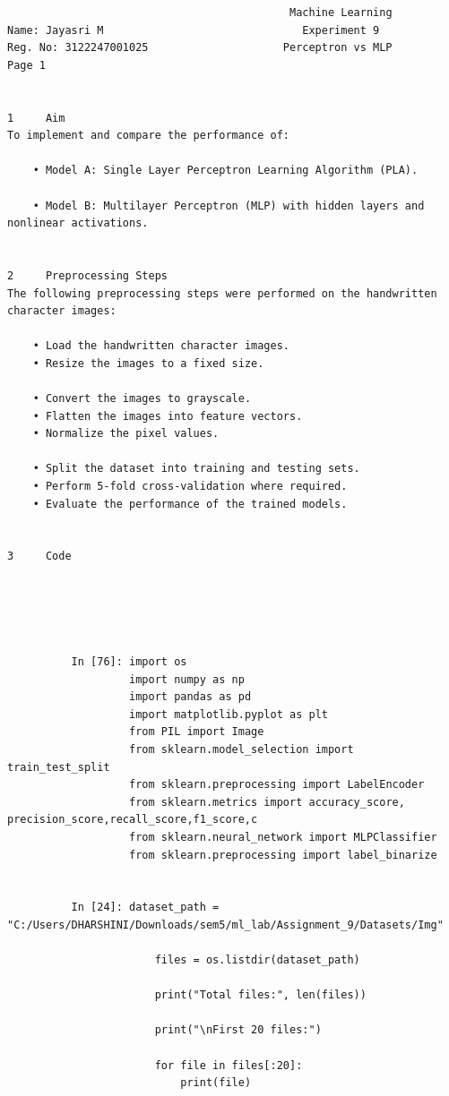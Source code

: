 \documentclass[12pt,a4paper]{article}
\begin{document}
\begin{lstlisting}
                                            Machine Learning
Name: Jayasri M                               Experiment 9
Reg. No: 3122247001025                     Perceptron vs MLP                               Page 1


1     Aim
To implement and compare the performance of:

    • Model A: Single Layer Perceptron Learning Algorithm (PLA).

    • Model B: Multilayer Perceptron (MLP) with hidden layers and nonlinear activations.


2     Preprocessing Steps
The following preprocessing steps were performed on the handwritten character images:

    • Load the handwritten character images.
    • Resize the images to a fixed size.

    • Convert the images to grayscale.
    • Flatten the images into feature vectors.
    • Normalize the pixel values.

    • Split the dataset into training and testing sets.
    • Perform 5-fold cross-validation where required.
    • Evaluate the performance of the trained models.


3     Code





          In [76]: import os
                   import numpy as np
                   import pandas as pd
                   import matplotlib.pyplot as plt
                   from PIL import Image
                   from sklearn.model_selection import train_test_split
                   from sklearn.preprocessing import LabelEncoder
                   from sklearn.metrics import accuracy_score, precision_score,recall_score,f1_score,c
                   from sklearn.neural_network import MLPClassifier
                   from sklearn.preprocessing import label_binarize


          In [24]: dataset_path = "C:/Users/DHARSHINI/Downloads/sem5/ml_lab/Assignment_9/Datasets/Img"

                       files = os.listdir(dataset_path)

                       print("Total files:", len(files))

                       print("\nFirst 20 files:")

                       for file in files[:20]:
                           print(file)


\end{lstlisting}
\end{document}
